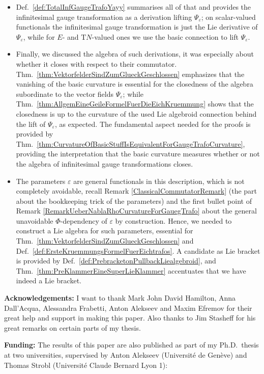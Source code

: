 \documentclass[a4paper,oneside,11pt,leqno]{scrartcl} %
\theoremstyle{plain}
\theoremstyle{remark}
\theoremstyle{definition}
\begin{document}
\begin{itemize}
	\item Def.~\ref{def:TotalInfGaugeTrafoYayy} summarises all of that and provides the infinitesimal gauge transformation as a derivation lifting $\Psi_\varepsilon$; on scalar-valued functionals the infinitesimal gauge transformation is just the Lie derivative of $\Psi_\varepsilon$, while for $E$- and $\mathrm{T}N$-valued ones we use the basic connection to lift $\Psi_\varepsilon$.
	\item Finally, we discussed the algebra of such derivations, it was especially about whether it closes with respect to their commutator. Thm.~\ref{thm:VektorfelderSindZumGlueckGeschlossen} emphasizes that the vanishing of the basic curvature is essential for the closedness of the algebra subordinate to the vector fields $\Psi_\varepsilon$; while Thm.~\ref{thm:AllgemEineGeileFormelFuerDieEichKruemmung} shows that the closedness is up to the curvature of the used Lie algebroid connection behind the lift of $\Psi_\varepsilon$, as expected. The fundamental aspect needed for the proofs is provided by Thm.~\ref{thm:CurvatureOfBasicStuffIsEquivalentForGaugeTrafoCurvature}, providing the interpretation that the basic curvature measures whether or not the algebra of infinitesimal gauge transformations closes. 
	\item The parameters $\varepsilon$ are general functionals in this description, which is not completely avoidable, recall Remark \ref{ClassicalCommutatorRemark} (the part about the bookkeeping trick of the parameters) and the first bullet point of Remark \ref{RemarkUeberNablaRhoCurvatureForGauegTrafo} about the general unavoidable $\Phi$-dependency of $\varepsilon$ by construction. Hence, we needed to construct a Lie algebra for such parameters, essential for Thm.~\ref{thm:VektorfelderSindZumGlueckGeschlossen} and Def.~\ref{def:ErsteKruemmungsFormelFuerEichtrafos}. A candidate as Lie bracket is provided by Def.~\ref{def:PrebracketonPullbackLiealgebroid}, and Thm.~\ref{thm:PreKlammerEineSuperLieKlammer} accentuates that we have indeed a Lie bracket.
\end{itemize}

\textbf{Acknowledgements:} I want to thank Mark John David Hamilton, Anna Dall'Acqua, Alessandra Frabetti, Anton Alekseev and Maxim Efremov for their great help and support in making this paper. Also thanks to Jim Stasheff for his great remarks on certain parts of my thesis.

\textbf{Funding:} The results of this paper are also published as part of my Ph.D.~thesis at two universities, supervised by Anton Alekseev (Universit\'{e} de Gen\`eve) and Thomas Strobl (Universit\'{e} Claude Bernard Lyon 1):
\end{document}
